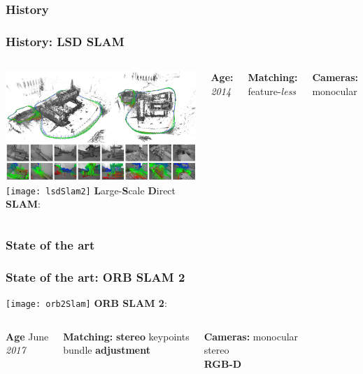 \documentclass[16pt]{beamer}
\begin{document}
\subsubsection*{History}
\begin{frame}
  \frametitle{History:   LSD SLAM}
  \begin{columns}
    \includegraphics[width=1\textwidth]{lsdSlam1}
    \texttt{[image: lsdSlam2]}
    \textbf{L}arge-\textbf{S}cale \textbf{D}irect \textbf{SLAM}:\\\medskip
    \begin{block}{\textbf{Age:}}
      \textsl{2014}
    \end{block}
    \bigskip
    \begin{block}{\textbf{Matching:}}
      feature-\textsl{less}
    \end{block}
    \bigskip
    \begin{block}{\textbf{Cameras:}}
      monocular
    \end{block}
  \end{columns}
\end{frame}
\subsubsection*{State of the art}
\begin{frame}
  \frametitle{State of the art:   ORB SLAM 2 }
  
  \texttt{[image: orb2Slam]}
  \medskip
  \textbf{ ORB SLAM 2}:
  \smallskip
  \begin{columns}
    \begin{block}{\textbf{Age}}
      June\\
      \textsl{2017}
    \end{block}
    \begin{block}{\textbf{Matching:}}
      \textbf{stereo} keypoints\\
      bundle \textbf{adjustment}
    \end{block}
    \begin{block}{\textbf{Cameras:}}
      monocular\\
      stereo\\
      \textbf{RGB-D}
    \end{block}
 
  \end{columns}
\end{frame}
\end{document}
